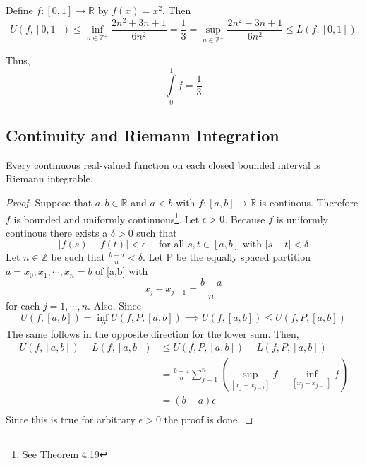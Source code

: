 \begin{exmp}
    Define $ f : [0,1] \to \mathbb{R}  $ by $ f(x) = x^2  $. Then 
    \[
        U\left( f, [0,1]\right) \leq \inf_{n \in \mathbb{Z}^+} \frac{ 2n^2 + 3n + 1 }{
        6n^2 } = \frac{ 1 }{ 3 } = \sup_{n \in \mathbb{Z}^+} \frac{ 2n^2 - 3n + 1 }{
        6n^2 } \leq L\left( f, [0,1]\right) 
    \]
\end{exmp}

Thus, \[
\int\limits_{0}^{1} f = \frac{ 1 }{ 3 } 
\]

\subsection{Continuity and Riemann Integration}
\label{subsec:Continuity and Riemann Integration}
\begin{ftheo}
    Every continuous real-valued function on each closed bounded interval is Riemann
    integrable.
    \label{th:Continuous Functions are Riemann Integrable}
\end{ftheo}
\begin{proof}
    Suppose that $ a,b \in \mathbb{R} $ and $ a < b $ with $ f : [a,b] \to \mathbb{R} $ is
    continous. Therefore $ f $ is bounded and uniformly continuous\footnote{See
    \cite{rudin:principles} Theorem 4.19}. Let $ \epsilon >0 $. Because $ f $ is uniformly
    continous there exists a $ \delta > 0 $ such that 
    \[
        \left | f(s) - f(t)  \right | < \epsilon  \quad \text{ for all } s,t \in [a,b]
        \text{ with } \left | s - t \right | < \delta  
    \]
    Let $ n \in \mathbb{Z} $ be such that $ \frac{ b-a }{ n  } < \delta  $. 
    Let P be the equally spaced partition $ a = x_0, x_1, \cdots , x_n  = b $ of [a,b]
    with 
    \[
        x_j - x_{j-1} = \frac{ b - a }{ n } 
    \] for each $ j = 1, \cdots , n  $. Also, Since 
    \[
     U\left(f,[a, b]\right) = \inf_P U\left(f, P ,[a, b]\right) \implies U\left(f,[a,
     b]\right) \leq U\left(f, P ,[a, b]\right)
    \] The same follows in the opposite direction for the lower sum.
    Then, 
    \begin{align*}
        U\left(f,[a, b]\right)-L\left(f,[a, b]\right) &\leq  U\left(f,P,[a,
        b]\right)-L\left(f,P,[a, b]\right) \\ 
                                                      &= \frac{ b-a }{ n } \sum_{j=1}^{n}
                                                      \left( \sup_{[x_j - x_{j-1}] } f -
                                                      \inf_{[x_j - x_{j-1}] } f \right)
                                                      \\ 
     &= \left( b-a\right) \epsilon   \\ 
    \end{align*}
    Since this is true for arbitrary $ \epsilon >0 $ the proof is done.  
\end{proof}

